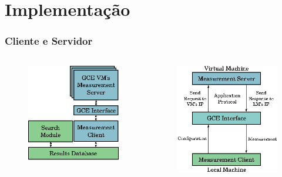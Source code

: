 \documentclass[10pt, compress]{beamer}
\begin{document}
\section{Implementação}

\begin{frame}[fragile]
  \frametitle{Cliente e Servidor}
    \begin{columns}
        \begin{figure}[H]
            \centering
            \includegraphics[scale=.62]{high-level-implementation}
        \end{figure}%
        \begin{figure}[H]
            \centering
            \includegraphics[scale=.62]{low-level-implementation}
        \end{figure}%
    \end{columns}
\end{frame}
\end{document}
